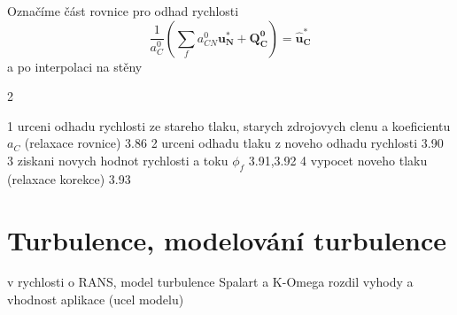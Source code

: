 Označíme část rovnice pro odhad rychlosti
\begin{equation}\label{key}
 \dfrac{1}{a_C^0} (\sum_f a_{CN}^0 \mathbf{u_N^*}+\mathbf{Q_C^0}) = \mathbf{\widehat{u}^*_C}
\end{equation}
a po interpolaci na stěny

2

1 urceni odhadu rychlosti ze stareho tlaku, starych zdrojovych clenu a koeficientu $ a_C $ (relaxace rovnice) 3.86
2 urceni odhadu tlaku z noveho odhadu rychlosti 3.90
3 ziskani novych hodnot rychlosti a toku $ \phi_f $ 3.91,3.92
4 vypocet noveho tlaku (relaxace korekce) 3.93

\section{Turbulence, modelování turbulence}
v rychlosti o RANS, model turbulence Spalart a K-Omega rozdil vyhody a vhodnost aplikace (ucel modelu)